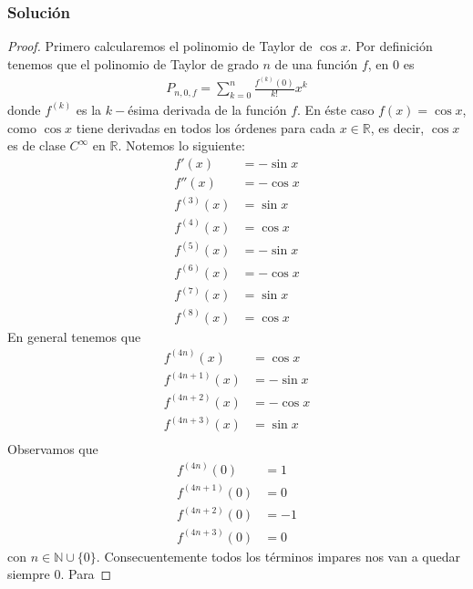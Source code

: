 \documentclass[a4paper]{article}
\begin{document}
\subsubsection*{Solución}
\begin{proof}
    Primero calcularemos el polinomio de Taylor de \(\cos{x}\).
    Por definición tenemos que el polinomio de Taylor de grado \(n\) de una función \(f\), en \(0\)
    es
    \begin{align*}
        P_{n, 0, f} = \sum_{k = 0}^{n} \frac{f^{(k)}(0)}{k!}x^{k}
    \end{align*}
    donde \(f^{(k)}\) es la \(k-\)ésima derivada de la función \(f\). En éste caso 
    \(f(x) = \cos{x}\), como \(\cos{x}\) tiene derivadas en todos los órdenes para cada 
    \(x \in \mathbb{R}\), es decir, \(\cos{x}\) es de clase \(C^{\infty}\) en \(\mathbb{R}\).
    \newline 
    Notemos lo siguiente:
    \begin{align*}
        f'(x) &= -\sin{x} \\
        f''(x) &= -\cos{x} \\
        f^{(3)}(x) &= \sin{x} \\
        f^{(4)}(x) &= \cos{x} \\
        f^{(5)}(x) &= -\sin{x} \\
        f^{(6)}(x) &= -\cos{x} \\
        f^{(7)}(x) &= \sin{x} \\
        f^{(8)}(x) &= \cos{x}
    \end{align*}
    En general tenemos que
    \begin{align*}
        f^{(4n)}(x) &= \cos{x} \\
        f^{(4n + 1)}(x) &= -\sin{x} \\
        f^{(4n + 2)}(x) &= -\cos{x} \\
        f^{(4n + 3)}(x) &= \sin{x} \\
    \end{align*}
    Observamos que
    \begin{align*}
        f^{(4n)}(0) &= 1 \\
        f^{(4n + 1)}(0) &= 0 \\
        f^{(4n + 2)}(0) &= -1 \\
        f^{(4n + 3)}(0) &= 0
    \end{align*}
    con \(n \in \mathbb{N} \cup \{0\}\).
    \newline
    Consecuentemente todos los términos impares nos van a quedar siempre \(0\). Para 

\end{proof}
\end{document}

